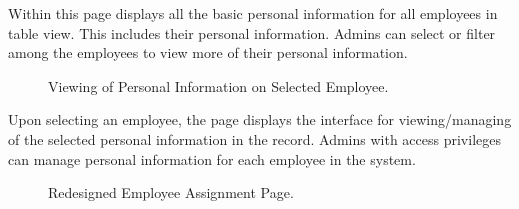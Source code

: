    Within this page displays all the basic personal information for all employees in table view. This includes their personal information. Admins can select or filter among the employees to view more of their personal information.

    \begin{figure}[H]
        \centering
        \caption{Viewing of Personal Information on Selected Employee.}
        \label{fig:app-pi-info}
    \end{figure}

    Upon selecting an employee, the page displays the interface for viewing/managing of the selected personal information in the record. Admins with access privileges can manage personal information for each employee  in the system.

    \begin{figure}[H]
        \centering
        \caption{Redesigned Employee Assignment Page.}
        \label{fig:app-assignment}
    \end{figure}

